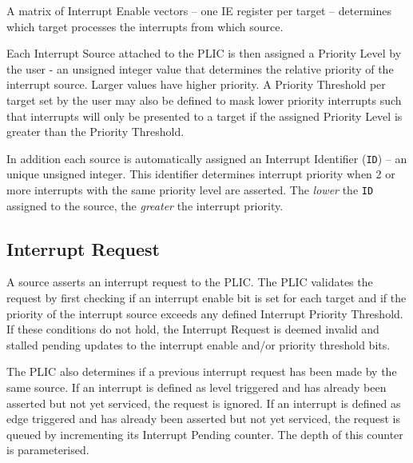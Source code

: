 A matrix of Interrupt Enable vectors -- one IE register per target --
determines which target processes the interrupts from which source.

Each Interrupt Source attached to the PLIC is then assigned a Priority
Level by the user - an unsigned integer value that determines the relative priority of
the interrupt source. Larger values have higher priority. A Priority Threshold 
per target set by the user may also be defined to mask lower priority interrupts such that 
interrupts will only be presented to a target if the assigned Priority Level 
is greater than the Priority Threshold.

In addition each source is automatically assigned an Interrupt Identifier
(\texttt{ID}) -- an unique unsigned integer. This identifier determines
interrupt priority when 2 or more interrupts with the same priority
level are asserted. The \emph{lower} the \texttt{ID} assigned to the source,
the \emph{greater} the interrupt priority.

\subsection{Interrupt Request}

A source asserts an interrupt request to the PLIC. The PLIC validates
the request by first checking if an interrupt enable bit is set for each
target and if the priority of the interrupt source exceeds any defined
Interrupt Priority Threshold. If these conditions do not hold, the
Interrupt Request is deemed invalid and stalled pending updates to the interrupt enable and/or priority threshold bits. 

The PLIC also determines if a previous interrupt request has been made by the same source.
If an interrupt is defined as level triggered and has already been asserted but not yet serviced, the request is ignored.
If an interrupt is defined as edge triggered and has already been asserted but not yet serviced, the request is queued by incrementing its Interrupt Pending counter.
The depth of this counter is parameterised.

